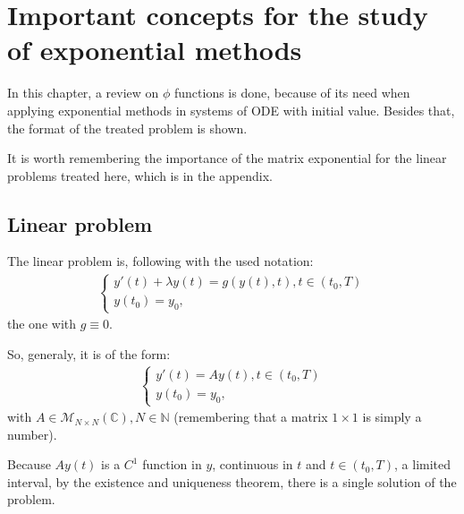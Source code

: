 \documentclass[letterpaper,10pt,english]{jupyterBook}
\begin{document}
\sphinxstepscope


\section{Important concepts for the study of exponential methods}
\label{\detokenize{cap3:important-concepts-for-the-study-of-exponential-methods}}\label{\detokenize{cap3::doc}}
\sphinxAtStartPar
In this chapter, a review on \(\phi\) functions is done, because of its need when applying exponential methods in systems of ODE with initial value. Besides that, the format of the treated problem is shown.

\sphinxAtStartPar
It is worth remembering the importance of the matrix exponential for the linear problems treated here, which is in the
appendix.


\subsection{Linear problem}
\label{\detokenize{cap3:linear-problem}}
\sphinxAtStartPar
The linear problem is, following with the used notation:
\begin{equation*}
\begin{split}
\begin{cases}
    y'(t) + \lambda y(t) = g(y(t), t), t \in (t_0, T) \\
    y(t_0) = y_0 
    \text{,}
\end{cases}
\end{split}
\end{equation*}
\sphinxAtStartPar
the one with \(g \equiv 0.\)

\sphinxAtStartPar
So, generaly, it is of the form:
\begin{equation*}
\begin{split}
\begin{cases}
    y'(t) = A y(t), t \in (t_0, T) \\
    y(t_0) = y_0 
    \text{,}
\end{cases}
\end{split}
\end{equation*}
\sphinxAtStartPar
with \(A \in \mathscr{M}_{N \times N}(\mathbb{C}), N \in \mathbb{N}\)  (remembering that a matrix \(1 \times 1\) is simply a number).

\sphinxAtStartPar
Because \(A y(t)\) is a \(C^1\) function in \(y\), continuous in \(t\) and \(t \in (t_0, T)\), a limited interval, by the existence and uniqueness theorem, there is a single solution of the problem.
\end{document}
